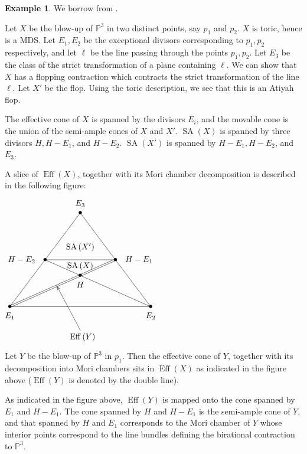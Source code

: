 \documentclass[12pt,twoside]{amsart}
\theoremstyle{definition}
\newtheorem{exmp}[theo]{Example}
\newcommand\SA{\mathop{\mathrm{SA}}\nolimits}
\newcommand\Eff{\mathop{\mathrm{Eff}}\nolimits}
\begin{document}
\begin{exmp}\label{bl-up of P^3}
We borrow from \cite[Example 5.5]{aw}.

Let $X$ be the blow-up of $\mathbb{P}^3$ in two distinct points, say $p_1$ and $p_2$. $X$ is
toric, hence is a MDS. Let 
$E_1,E_2$ be the exceptional divisors corresponding to $p_1,p_2$ respectively, and
let $\ell$ be the line passing through the points $p_1,p_2$.
Let $E_3$ be the class of the strict transformation of a plane containing $\ell$.
We can show that $X$ has a flopping contraction which contracts
the strict transformation of the line $\ell$. Let $X'$ be the flop. Using the toric description,
we see that this is an Atiyah flop.

The effective cone of $X$ is spanned by the divisors $E_i$, and
the movable cone is the union of the semi-ample cones of $X$ and $X'$.
$\SA{(X)}$ is spanned by three divisors $H,H-E_1$, and $H-E_2$. $\SA{(X')}$ is
spanned by $H-E_1,H-E_2$, and $E_3$.

A slice of $\Eff{(X)}$, together with its Mori chamber decomposition is described
in the following figure:

\vspace{5mm}

$\begin{xy}
(0,0)="A"*{\bullet},
"A"+<6cm,0cm>="B"*{\bullet},
"A"+<3cm,4cm>="C"*{\bullet},
"A"+<1.5cm,2cm>="D"*{\bullet},
"D"+<3cm,0cm>="E"*{\bullet},
"A"+<3cm,1.33333cm>="F"*{\bullet},
(0,-4)="E_1"*{E_1},
"B"+(0,-4)="E_2"*{E_2},
"C"+(0,4)="E_3"*{E_3},
"D"+(-10,0)="H-E_2"*{H-E_2},
"E"+(10,0)="H-E_1"*{H-E_1},
"F"+(0,-4)="H"*{H},
"F"+(0,4)="SA(X)"*{\SA{(X)}},
"F"+(0,12)="SA(X')"*{\SA{(X')}},
"A"+<2cm,0.888889cm>="T",
"A"+<3cm,-1cm>="S",
"S"+(1,-3)*{\Eff{(Y)}}
\ar"S";"T"
\ar@{-}"A";"B"
\ar@{-}"A";"C"
\ar@{-}"B";"C"
\ar@{=}"A";"E"
\ar@{-}"B";"D"
\ar@{-}"D";"E"
\end{xy}$
\vspace{5mm}




Let $Y$ be the blow-up of $\mathbb{P}^3$ in $p_1$. Then the effective cone of $Y$, together with
its decomposition into Mori chambers sits in $\Eff{(X)}$ as indicated in the figure above ($\Eff{(Y)}$ is
denoted by the double line).

As indicated in the figure above, $\Eff{(Y)}$ is mapped onto the cone spanned by
$E_1$ and $H-E_1$. The cone spanned by $H$ and $H-E_1$ is the semi-ample cone of $Y$, and
that spanned by $H$ and $E_1$ corresponds to the Mori chamber of $Y$ whose interior points
correspond to the line bundles defining the birational contraction to $\mathbb{P}^3$.


\end{exmp}
\end{document}
